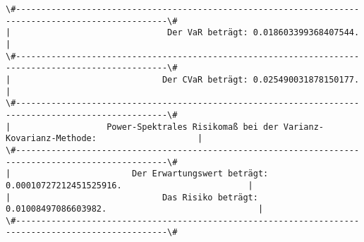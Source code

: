 \documentclass[paper=landscape]{scrartcl}
\begin{document}
    \begin{Verbatim}[commandchars=\\\{\}]
\#----------------------------------------------------------------------------------------------------\#
|                               Der VaR beträgt: 0.018603399368407544.                               | 
\#----------------------------------------------------------------------------------------------------\#
|                              Der CVaR beträgt: 0.025490031878150177.                               | 
\#----------------------------------------------------------------------------------------------------\#
|                   Power-Spektrales Risikomaß bei der Varianz-Kovarianz-Methode:                    | 
\#----------------------------------------------------------------------------------------------------\#
|                        Der Erwartungswert beträgt: 0.00010727212451525916.                         | 
|                              Das Risiko beträgt: 0.01008497086603982.                              | 
\#----------------------------------------------------------------------------------------------------\#

    \end{Verbatim}


    
    
    
    
\end{document}
